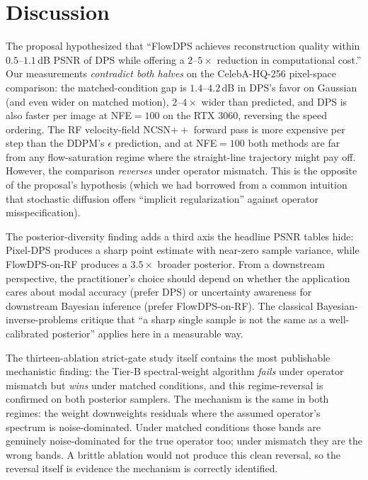 \documentclass{article}
\begin{document}
\section{Discussion}

The proposal hypothesized that ``FlowDPS achieves reconstruction
quality within $0.5$--$1.1$\,dB PSNR of DPS while offering a $2$--$5\times$
reduction in computational cost.'' Our measurements
\emph{contradict both halves} on the CelebA-HQ-256 pixel-space
comparison: the matched-condition gap is $1.4$--$4.2$\,dB in DPS's favor
on Gaussian (and even wider on matched motion), $2$--$4\times$ wider than
predicted, and DPS is also faster per image at NFE${=}100$ on the RTX
3060, reversing the speed ordering. The RF velocity-field NCSN$++$ forward
pass is more expensive per step than the DDPM's $\epsilon$ prediction,
and at NFE${=}100$ both methods are far from any flow-saturation regime
where the straight-line trajectory might pay off. However, the
comparison \emph{reverses} under operator mismatch. This is the opposite
of the proposal's hypothesis (which we had borrowed from a common
intuition that stochastic diffusion offers ``implicit regularization''
against operator misspecification).

The posterior-diversity finding adds a third axis the headline PSNR
tables hide: Pixel-DPS produces a sharp point estimate with near-zero
sample variance, while FlowDPS-on-RF produces a $3.5\times$ broader
posterior. From a downstream perspective, the practitioner's choice
should depend on whether the application cares about modal accuracy
(prefer DPS) or uncertainty awareness for downstream Bayesian inference
(prefer FlowDPS-on-RF). The classical Bayesian-inverse-problems
critique that ``a sharp single sample is not the same as a
well-calibrated posterior'' applies here in a measurable way.

The thirteen-ablation strict-gate study itself contains the most
publishable mechanistic finding: the Tier-B spectral-weight algorithm
\emph{fails} under operator mismatch but \emph{wins} under matched
conditions, and this regime-reversal is confirmed on both
posterior samplers. The mechanism is the same in both regimes: the
weight downweights residuals where the assumed operator's spectrum is
noise-dominated. Under matched conditions those bands are genuinely
noise-dominated for the true operator too; under mismatch they are the
wrong bands. A brittle ablation would not produce this clean reversal,
so the reversal itself is evidence the mechanism is correctly
identified.
\end{document}
